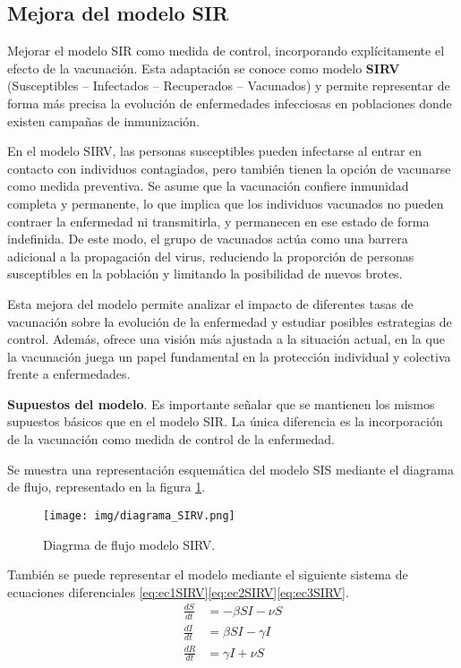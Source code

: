 \subsection{Mejora del modelo SIR}
Mejorar el modelo SIR como medida de control, incorporando explícitamente el efecto de la vacunación. Esta adaptación se conoce como modelo \textbf{SIRV} (Susceptibles – Infectados – Recuperados – Vacunados) y permite representar de forma más precisa la evolución de enfermedades infecciosas en poblaciones donde existen campañas de inmunización.

En el modelo SIRV, las personas susceptibles pueden infectarse al entrar en contacto con individuos contagiados, pero también tienen la opción de vacunarse como medida preventiva. Se asume que la vacunación confiere inmunidad completa y permanente, lo que implica que los individuos vacunados no pueden contraer la enfermedad ni transmitirla, y permanecen en ese estado de forma indefinida. De este modo, el grupo de vacunados actúa como una barrera adicional a la propagación del virus, reduciendo la proporción de personas susceptibles en la población y limitando la posibilidad de nuevos brotes.

Esta mejora del modelo permite analizar el impacto de diferentes tasas de vacunación sobre la evolución de la enfermedad y estudiar posibles estrategias de control. Además, ofrece una visión más ajustada a la situación actual, en la que la vacunación juega un papel fundamental en la protección individual y colectiva frente a enfermedades.

\textbf{Supuestos del modelo}. Es importante señalar que se mantienen los mismos supuestos básicos que en el modelo SIR. La única diferencia es la incorporación de la vacunación como medida de control de la enfermedad.

Se muestra una representación esquemática del modelo SIS mediante el diagrama de flujo, representado en la figura \ref{fig:ejemplo SIRV}.

\begin{figure}[H]
    \centering
    \texttt{[image: img/diagrama\_SIRV.png]}
    \caption{Diagrma de flujo modelo SIRV.}
    \label{fig:ejemplo SIRV}
    \vspace{0.5cm} %
\end{figure}

También se puede representar el modelo mediante el siguiente sistema de ecuaciones diferenciales \eqref{eq:ec1SIRV}\eqref{eq:ec2SIRV}\eqref{eq:ec3SIRV}.
\begin{align}
\frac{dS}{dt} &= -\beta SI - \nu S \label{eq:ec1SIRV} \\
\frac{dI}{dt} &= \beta SI - \gamma I \label{eq:ec2SIRV} \\
\frac{dR}{dt} &= \gamma I + \nu S \label{eq:ec3SIRV}
\end{align}

